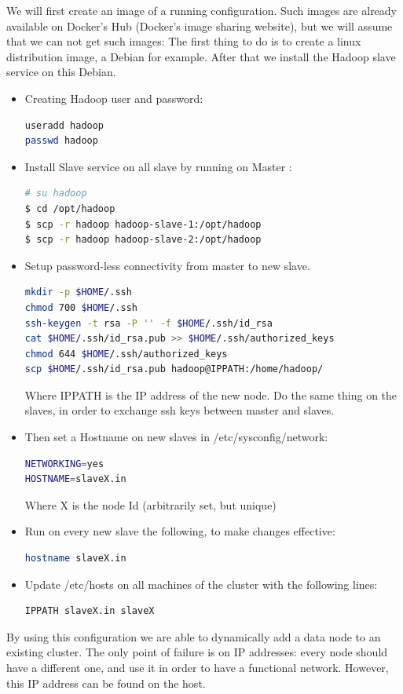 \documentclass[11pt]{report} %
\begin{document}
We will first create an image of a running configuration. Such images are already available on Docker's Hub (Docker's image sharing website), but we will assume that we can not get such images: 
The first thing to do is to create a linux distribution image, a Debian for example. After that we install the Hadoop slave service on this Debian.

\begin{itemize}
\item Creating Hadoop user and password: 

\begin{lstlisting}[language=bash]
useradd hadoop
passwd hadoop
\end{lstlisting}

\item Install Slave service on all slave by running on Master :
\begin{lstlisting}[language=bash]
# su hadoop 
$ cd /opt/hadoop 
$ scp -r hadoop hadoop-slave-1:/opt/hadoop 
$ scp -r hadoop hadoop-slave-2:/opt/hadoop
\end{lstlisting}
\item Setup password-less connectivity from master to new slave.
\begin{lstlisting}[language=bash]
mkdir -p $HOME/.ssh 
chmod 700 $HOME/.ssh 
ssh-keygen -t rsa -P '' -f $HOME/.ssh/id_rsa 
cat $HOME/.ssh/id_rsa.pub >> $HOME/.ssh/authorized_keys 
chmod 644 $HOME/.ssh/authorized_keys
scp $HOME/.ssh/id_rsa.pub hadoop@IPPATH:/home/hadoop/
\end{lstlisting}
Where IPPATH is the IP address of the new node.
Do the same thing on the slaves, in order to exchange ssh keys between master and slaves.

\item Then set a Hostname on new slaves in  /etc/sysconfig/network:
\begin{lstlisting}[language=bash]
NETWORKING=yes 
HOSTNAME=slaveX.in
\end{lstlisting}
Where X is the node Id (arbitrarily set, but unique)

\item Run on every new slave the following, to make changes effective: 
\begin{lstlisting}[language=bash]
hostname slaveX.in
\end{lstlisting}

\item Update /etc/hosts on all machines of the cluster with the following lines:
\begin{lstlisting}[language=bash]
IPPATH slaveX.in slaveX
\end{lstlisting}
\end{itemize}
By using this configuration we are able to dynamically add a data node to an existing cluster. The only point of failure is on IP addresses: every node should have a different one, and use it in order to have a functional network. However, this IP address can be found on the host.
\end{document}
